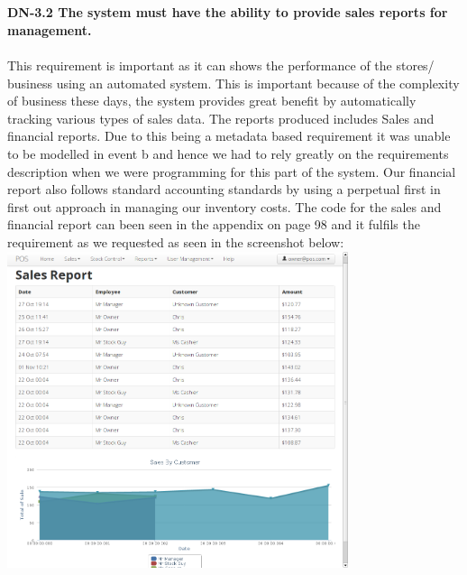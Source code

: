 \documentclass[a4paper]{article}
\begin{document}
\\\\
\textbf{DN-3.2 The system must have the ability to provide sales reports for management.}
\\\\
This requirement is important as it can shows the performance of the stores/ business using an automated system. This is important because of the complexity of business these days, the system provides great benefit by automatically tracking various types of sales data. The reports produced includes Sales and financial reports. Due to this being a metadata based requirement it was unable to be modelled in event b and hence we had to rely greatly on the requirements description when we were programming for this part of the system. Our financial report also follows standard accounting standards by using a perpetual first in first out approach in managing our inventory costs. The code for the sales and financial report can been seen in the appendix on page 98 and it fulfils the requirement as we requested as seen in the screenshot below: \includegraphics[width=10cm]{d8.png}
\\\\
\end{document}
